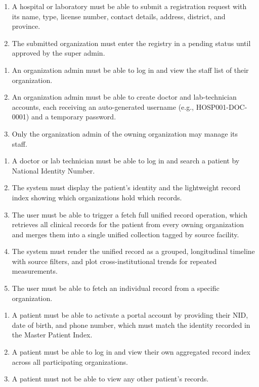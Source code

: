 \documentclass[12pt]{report}
\numberwithin{equation}{chapter}
\begin{document}
\begin{enumerate}
    \item A hospital or laboratory must be able to submit a registration request with its name, type, license number, contact details, address, district, and province.
    \item The submitted organization must enter the registry in a pending status until approved by the super admin.
\end{enumerate}

\begin{enumerate}
    \item An organization admin must be able to log in and view the staff list of their organization.
    \item An organization admin must be able to create doctor and lab-technician accounts, each receiving an auto-generated username (e.g., HOSP001-DOC-0001) and a temporary password.
    \item Only the organization admin of the owning organization may manage its staff.
\end{enumerate}

\begin{enumerate}
    \item A doctor or lab technician must be able to log in and search a patient by National Identity Number.
    \item The system must display the patient's identity and the lightweight record index showing which organizations hold which records.
    \item The user must be able to trigger a fetch full unified record operation, which retrieves all clinical records for the patient from every owning organization and merges them into a single unified collection tagged by source facility.
    \item The system must render the unified record as a grouped, longitudinal timeline with source filters, and plot cross-institutional trends for repeated measurements.
    \item The user must be able to fetch an individual record from a specific organization.
\end{enumerate}

\begin{enumerate}
    \item A patient must be able to activate a portal account by providing their NID, date of birth, and phone number, which must match the identity recorded in the Master Patient Index.
    \item A patient must be able to log in and view their own aggregated record index across all participating organizations.
    \item A patient must not be able to view any other patient's records.
\end{enumerate}
\end{document}
